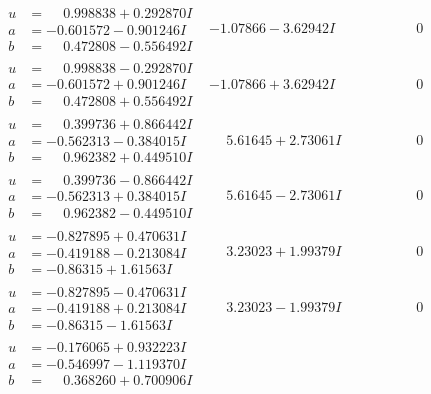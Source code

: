 \documentclass[1p]{elsarticle_modified}
\theoremstyle{definition}
\begin{document}
$$\begin{array}{c|c|c}
\begin{aligned}
u &= \phantom{-}0.998838 + 0.292870 I \\
a &= -0.601572 - 0.901246 I \\
b &= \phantom{-}0.472808 - 0.556492 I\end{aligned}
 & -1.07866 - 3.62942 I & \phantom{-0.000000 } 0 \\ \hline\begin{aligned}
u &= \phantom{-}0.998838 - 0.292870 I \\
a &= -0.601572 + 0.901246 I \\
b &= \phantom{-}0.472808 + 0.556492 I\end{aligned}
 & -1.07866 + 3.62942 I & \phantom{-0.000000 } 0 \\ \hline\begin{aligned}
u &= \phantom{-}0.399736 + 0.866442 I \\
a &= -0.562313 - 0.384015 I \\
b &= \phantom{-}0.962382 + 0.449510 I\end{aligned}
 & \phantom{-}5.61645 + 2.73061 I & \phantom{-0.000000 } 0 \\ \hline\begin{aligned}
u &= \phantom{-}0.399736 - 0.866442 I \\
a &= -0.562313 + 0.384015 I \\
b &= \phantom{-}0.962382 - 0.449510 I\end{aligned}
 & \phantom{-}5.61645 - 2.73061 I & \phantom{-0.000000 } 0 \\ \hline\begin{aligned}
u &= -0.827895 + 0.470631 I \\
a &= -0.419188 - 0.213084 I \\
b &= -0.86315 + 1.61563 I\end{aligned}
 & \phantom{-}3.23023 + 1.99379 I & \phantom{-0.000000 } 0 \\ \hline\begin{aligned}
u &= -0.827895 - 0.470631 I \\
a &= -0.419188 + 0.213084 I \\
b &= -0.86315 - 1.61563 I\end{aligned}
 & \phantom{-}3.23023 - 1.99379 I & \phantom{-0.000000 } 0 \\ \hline\begin{aligned}
u &= -0.176065 + 0.932223 I \\
a &= -0.546997 - 1.119370 I \\
b &= \phantom{-}0.368260 + 0.700906 I\end{aligned}

\end{array}$$
\end{document}
